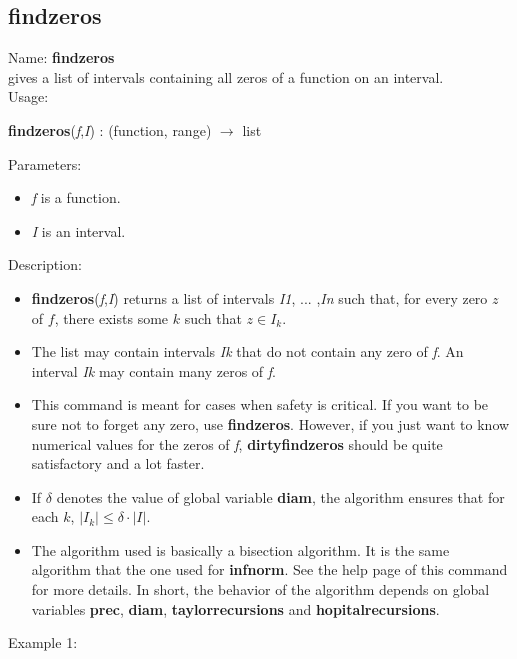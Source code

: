 \subsection{findzeros}
\label{labfindzeros}
\noindent Name: \textbf{findzeros}\\
gives a list of intervals containing all zeros of a function on an interval.\\
\noindent Usage: 
\begin{center}
\textbf{findzeros}(\emph{f},\emph{I}) : (\textsf{function}, \textsf{range}) $\rightarrow$ \textsf{list}
\\ 
\end{center}
Parameters: 
\begin{itemize}
\item \emph{f} is a function.
\item \emph{I} is an interval.
\end{itemize}
\noindent Description: \begin{itemize}

\item \textbf{findzeros}(\emph{f},\emph{I}) returns a list of intervals \emph{I1}, ... ,\emph{In} such that, for 
   every zero $z$ of $f$, there exists some $k$ such that $z \in I_k$.

\item The list may contain intervals \emph{Ik} that do not contain any zero of \emph{f}.
   An interval \emph{Ik} may contain many zeros of \emph{f}.

\item This command is meant for cases when safety is critical. If you want to be sure
   not to forget any zero, use \textbf{findzeros}. However, if you just want to know 
   numerical values for the zeros of \emph{f}, \textbf{dirtyfindzeros} should be quite 
   satisfactory and a lot faster.

\item If $\delta$ denotes the value of global variable \textbf{diam}, the algorithm ensures
   that for each $k$, $|I_k| \le \delta \cdot |I|$.

\item The algorithm used is basically a bisection algorithm. It is the same algorithm
   that the one used for \textbf{infnorm}. See the help page of this command for more 
   details. In short, the behavior of the algorithm depends on global variables
   \textbf{prec}, \textbf{diam}, \textbf{taylorrecursions} and \textbf{hopitalrecursions}.
\end{itemize}
\noindent Example 1: 
